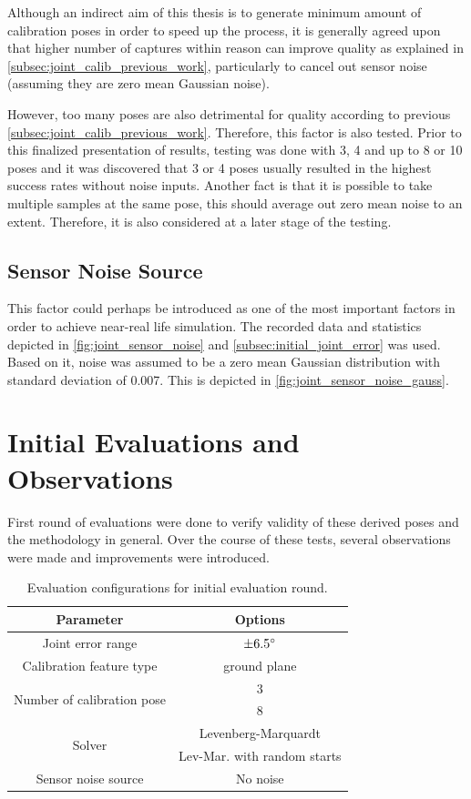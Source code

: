 \documentclass[english, printversion, nomenclature, notitle]{tuvisionthesis} %
\begin{document}
Although an indirect aim of this thesis is to generate minimum amount of calibration poses in order to speed up the process, it is generally agreed upon that higher number of captures within reason can improve quality as explained in \cref{subsec:joint_calib_previous_work}, particularly to cancel out sensor noise (assuming they are zero mean Gaussian noise).

However, too many poses are also detrimental for quality according to previous \cref{subsec:joint_calib_previous_work}. Therefore, this factor is also tested. Prior to this finalized presentation of results, testing was done with 3, 4 and up to 8 or 10 poses and it was discovered that 3 or 4 poses usually resulted in the highest success rates without noise inputs. Another fact is that it is possible to take multiple samples at the same pose, this should average out zero mean noise to an extent. Therefore, it is also considered at a later stage of the testing.

\subsection{Sensor Noise Source}

This factor could perhaps be introduced as one of the most important factors in order to achieve near-real life simulation. The recorded data and statistics depicted in \cref{fig:joint_sensor_noise} and \cref{subsec:initial_joint_error} was used. Based on it, noise was assumed to be a zero mean Gaussian distribution with standard deviation of 0.007. This is depicted in \cref{fig:joint_sensor_noise_gauss}.

\section{Initial Evaluations and Observations}
\label{subsec:initialEval}

First round of evaluations were done to verify validity of these derived poses and the methodology in general. Over the course of these tests, several observations were made and improvements were introduced.

\begin{table}[]
	\centering
	\begin{tabular}{@{}cc@{}}
		\toprule
		\textbf{Parameter} & \textbf{Options} \\ \midrule
		Joint error range & $\pm 6.5\degree$ \\ \midrule
		Calibration feature type& ground plane \\ \midrule
		\multirow{2}{*}{Number of calibration pose}
		&3\\ 
		&8\\ \midrule
		\multirow{2}{*}{Solver} & Levenberg-Marquardt\\
		& Lev-Mar. with random starts\\ \midrule
		Sensor noise source	& No noise \\ \bottomrule
	\end{tabular}
	\caption{Evaluation configurations for initial evaluation round.}
	\label{tab:initial_test_config}
\end{table}
\end{document}
